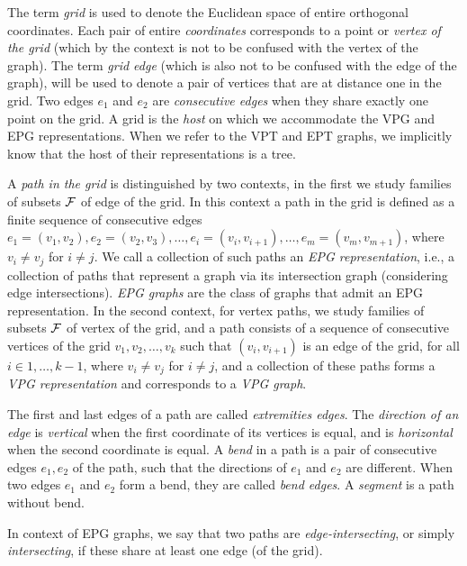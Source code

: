 The term \emph{grid} is used to denote the Euclidean space of entire orthogonal coordinates. Each pair of entire \emph{coordinates} corresponds to a point or \emph{vertex of the grid} (which by the context is not to be confused with the vertex of the graph). The term \emph{grid edge} (which is also not to be confused with the edge of the graph), will be used to denote a pair of vertices that are at distance one in the grid. Two edges $ e_1 $ and $ e_2 $ are \emph{consecutive edges} when they share exactly one point on the grid. A grid is the \emph{host} on which we accommodate the VPG and EPG representations. When we refer to the VPT and EPT graphs, we implicitly know that the host of their representations is a tree.



 A \emph{path in the grid} is distinguished by two contexts, in the first we study families of subsets $\cal{F}$ of edge of the grid. In this context a path in the grid is defined as a finite sequence of consecutive edges  $e_1 = (v_1, v_{2}), e_2 = (v_2, v_{3}), \dots, e_i = (v_i, v_{i+1}), \dots, e_m = (v_{m}, v_{m+1})$,  where   $v_i \neq v_j$ for $i \neq j$.  We call a collection of such paths an {\it EPG representation}, i.e., a collection of paths that represent a graph via its intersection graph (considering edge intersections). {\it EPG graphs} are the class of graphs that admit an EPG representation.
  In the second context, for vertex paths, we study families of subsets $\cal{F}$ of vertex of the grid, and a path consists of a sequence of consecutive vertices of the grid  $v_1, v_2, \dots , v_k$ such that $(v_i, v_{i+1})$ is an edge of the grid, for all $i \in {1, \dots,  k - 1}$, where   $v_i \neq v_j$ for $i \neq j$, and a collection of these paths forms a {\it VPG representation} and corresponds to a {\it VPG graph}. 

 
 The first and last edges of a path are called \emph{extremities edges}.
The \emph{direction of an edge} is \emph{vertical} when the first coordinate of its vertices is equal, and is \emph{horizontal} when the second coordinate is equal. A \emph {bend} in a path is a pair of consecutive edges $ e_1, e_2 $ of the path, such that the directions of $ e_1 $ and $ e_2 $ are different. When two edges $ e_1 $ and $ e_2 $ form a bend, they are called \emph{bend edges}. A \emph{segment} is a path without bend.
 
 In context of EPG graphs, we say that two paths are
 \emph{edge-intersecting}, or simply  \emph{intersecting}, if these share at least one edge (of the grid).
 
